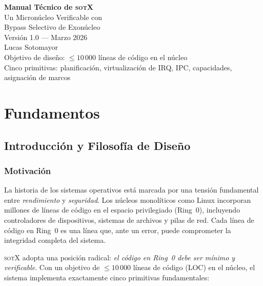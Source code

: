 \documentclass[11pt,twoside,openright]{book}
\theoremstyle{definition}
\theoremstyle{plain}
\theoremstyle{remark}
\newcommand{\sotos}{\textsc{sotX}}
\begin{document}
\begin{titlepage}
\centering
\vspace*{3cm}
{\Huge\bfseries Manual Técnico de \sotos\\[0.3cm]}
{\Large Un Micronúcleo Verificable con\\Bypass Selectivo de Exonúcleo}\\[2cm]
{\large Versión 1.0 — Marzo 2026}\\[3cm]
{\Large Lucas Sotomayor}\\[1cm]
\vfill
{\small
Objetivo de diseño: $\leq 10\,000$ líneas de código en el núcleo\\
Cinco primitivas: planificación, virtualización de IRQ, IPC, capacidades, asignación de marcos
}
\end{titlepage}

\frontmatter
\tableofcontents

\mainmatter
\part{Fundamentos}

\chapter{Introducción y Filosofía de Diseño}
\label{chap:intro}

\section{Motivación}

La historia de los sistemas operativos está marcada por una tensión fundamental entre
\emph{rendimiento} y \emph{seguridad}. Los núcleos monolíticos como Linux incorporan
millones de líneas de código en el espacio privilegiado (Ring~0), incluyendo controladores
de dispositivos, sistemas de archivos y pilas de red. Cada línea de código en Ring~0
es una línea que, ante un error, puede comprometer la integridad completa del sistema.

\sotos{} adopta una posición radical: \emph{el código en Ring~0 debe ser mínimo y
verificable}. Con un objetivo de $\leq 10\,000$ líneas de código (LOC) en el núcleo,
el sistema implementa exactamente cinco primitivas fundamentales:
\end{document}

